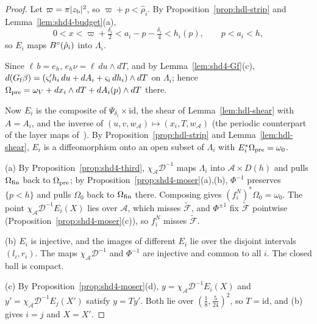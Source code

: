 \begin{proof}
Let $\varpi=\pi|z_{\rm b}|^2$, so $\varpi+p<\hat\rho_i$. By Proposition~\ref{prop:hdl-strip} and Lemma~\ref{lem:shd4-budget}(a),
\[
0<x<\varpi+\tfrac{\delta_i}2<a_i-p-\tfrac{\delta_i}4<h_i(p),\qquad p<a_i<h,
\]
so $E_i$ maps $B^{\circ}(\hat\rho_i)$ into $\Lambda_i$.

Since $\ell\,b=e_h$, $e_h\nu=\ell\,du\wedge dT$, and by Lemma~\ref{lem:shd4-Gf}(c), $d(G_{\rm f}\beta)=(\varsigma_i'h_i\,du+dA_i+\varsigma_i\,dh_i)\wedge dT$ on $\Lambda_i$; hence $\Omega_{\rm pre}=\omega_V+dx_i\wedge dT+dA_i(p)\wedge dT$ there.

Now $E_i$ is the composite of $\Psi_{\delta_i}\times\mathrm{id}$, the shear of Lemma~\ref{lem:hdl-shear} with $A=A_i$, and the inverse of $(u,v,w_{\mathcal A})\mapsto(x_i,T,w_{\mathcal A})$ (the periodic counterpart of the layer maps of~\cite{SongHD}). By Proposition~\ref{prop:hdl-strip} and Lemma~\ref{lem:hdl-shear}, $E_i$ is a diffeomorphism onto an open subset of $\Lambda_i$ with $E_i^*\Omega_{\rm pre}=\omega_0$.

(a) By Proposition~\ref{prop:shd4-third}, $\chi_{\mathcal A}\mathcal D^{-1}$ maps $\Lambda_i$ into $\mathcal A\times D(h)$ and pulls $\Omega_{\rm fin}$ back to $\Omega_{\rm pre}$; by Proposition~\ref{prop:shd4-moser}(a),(b), $\Phi^{-1}$ preserves $\{p<h\}$ and pulls $\Omega_0$ back to $\Omega_{\rm fin}$ there. Composing gives $(f^N_i)^*\Omega_0=\omega_0$. The point $\chi_{\mathcal A}\mathcal D^{-1}E_i(X)$ lies over $\mathcal A$, which misses $\widetilde{\mathcal F}$, and $\Phi^{\pm1}$ fix $\widetilde{\mathcal F}$ pointwise (Proposition~\ref{prop:shd4-moser}(c)), so $f^N_i$ misses $\widetilde{\mathcal F}$.

(b) $E_i$ is injective, and the images of different $E_i$ lie over the disjoint intervals $(l_i,r_i)$. The maps $\chi_{\mathcal A}\mathcal D^{-1}$ and $\Phi^{-1}$ are injective and common to all $i$. The closed ball is compact.

(c) By Proposition~\ref{prop:shd4-moser}(d), $y=\chi_{\mathcal A}\mathcal D^{-1}E_i(X)$ and $y'=\chi_{\mathcal A}\mathcal D^{-1}E_j(X')$ satisfy $y=Ty'$. Both lie over $(\frac18,\frac5{24})^2$, so $T=\mathrm{id}$, and (b) gives $i=j$ and $X=X'$.
\end{proof}

